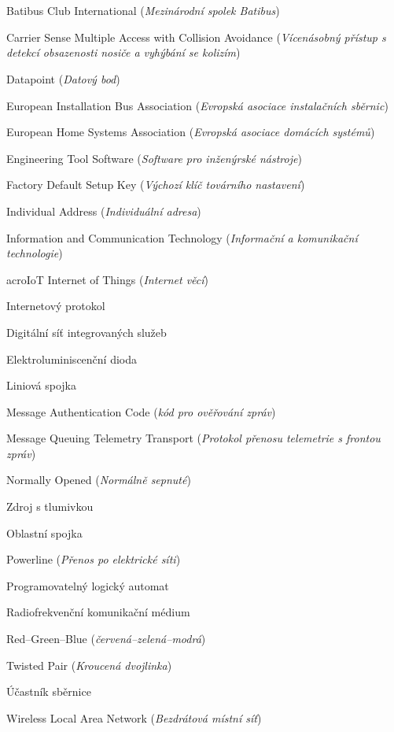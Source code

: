 \cleardoublepage
\chapter*{\listofabbrevname}
{}

\begin{acronym}[KolikMista]
	{Batibus Club International (\textit{Mezinárodní spolek Batibus})}

	{Carrier Sense Multiple Access with Collision Avoidance (\textit{Vícenásobný přístup s detekcí obsazenosti nosiče a vyhýbání se kolizím})}

	{Datapoint (\textit{Datový bod})}

	{European Installation Bus Association (\textit{Evropská asociace instalačních sběrnic})}

	{European Home Systems Association (\textit{Evropská asociace domácích systémů})}

	{Engineering Tool Software (\textit{Software pro inženýrské nástroje})}

	{Factory Default Setup Key (\textit{Výchozí klíč továrního nastavení})}

	{Individual Address (\textit{Individuální adresa})}

	{Information and Communication Technology (\textit{Informační a komunikační technologie})}

	acro{IoT}
	{Internet of Things (\textit{Internet věcí})}

	{Internetový protokol}

	{Digitální síť integrovaných služeb}

	{Elektroluminiscenční dioda}

	{Liniová spojka}

	{Message Authentication Code (\textit{kód pro ověřování zpráv})}

	{Message Queuing Telemetry Transport (\textit{Protokol přenosu telemetrie s frontou zpráv})}

	{Normally Opened (\textit{Normálně sepnuté})}

	{Zdroj s tlumivkou}

	{Oblastní spojka}

	{Powerline (\textit{Přenos po elektrické síti})}

	{Programovatelný logický automat}

	{Radiofrekvenční komunikační médium}

	{Red–Green–Blue (\textit{červená–zelená–modrá})}

	{Twisted Pair (\textit{Kroucená dvojlinka})}

	{Účastník sběrnice}

	{Wireless Local Area Network (\textit{Bezdrátová místní síť})}
\end{acronym}

